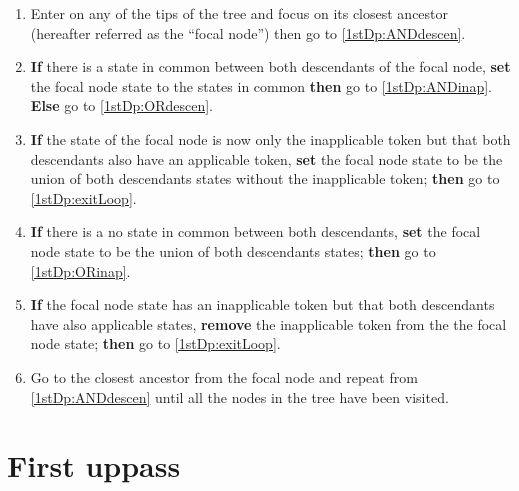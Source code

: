 \documentclass[a4paper,12pt]{article}
\begin{document}
\begin{enumerate}
    \item Enter on any of the tips of the tree and focus on its closest ancestor (hereafter referred as the ``focal node'') then go to \ref{1stDp:ANDdescen}.
    \item \label{1stDp:ANDdescen} \textbf{If} there is a state in common between both descendants of the focal node, \textbf{set} the focal node state to the states in common \textbf{then} go to \ref{1stDp:ANDinap}. \textbf{Else} go to \ref{1stDp:ORdescen}.
    \item \label{1stDp:ANDinap} \textbf{If} the state of the focal node is now only the inapplicable token but that both descendants also have an applicable token, \textbf{set} the focal node state to be the union of both descendants states without the inapplicable token; \textbf{then} go to \ref{1stDp:exitLoop}.
    \item \label{1stDp:ORdescen} \textbf{If} there is a no state in common between both descendants, \textbf{set} the focal node state to be the union of both descendants states; \textbf{then} go to \ref{1stDp:ORinap}.
    \item \label{1stDp:ORinap} \textbf{If} the focal node state has an inapplicable token but that both descendants have also applicable states, \textbf{remove} the inapplicable token from the the focal node state; \textbf{then} go to \ref{1stDp:exitLoop}.
    \item \label{1stDp:exitLoop} Go to the closest ancestor from the focal node and repeat from \ref{1stDp:ANDdescen} until all the nodes in the tree have been visited.
\end{enumerate}


\section{First uppass}
\end{document}
